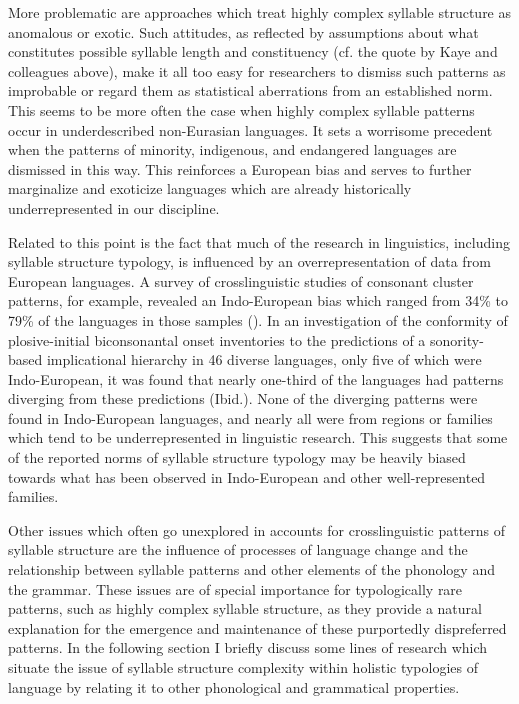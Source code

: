   More problematic are approaches which treat highly complex syllable structure as anomalous or exotic. Such attitudes, as reflected by assumptions about what constitutes possible syllable length and constituency (cf. the quote by Kaye and colleagues above), make it all too easy for researchers to dismiss such patterns as improbable or regard them as statistical aberrations from an established norm. This seems to be more often the case when highly complex syllable patterns occur in underdescribed non-Eurasian languages. It sets a worrisome precedent when the patterns of minority, indigenous, and endangered languages are dismissed in this way. This reinforces a European bias and serves to further marginalize and exoticize languages which are already historically underrepresented in our discipline.

  Related to this point is the fact that much of the research in linguistics, including syllable structure typology, is influenced by an overrepresentation of data from European languages. A survey of crosslinguistic studies of consonant cluster patterns, for example, revealed an Indo-European bias which ranged from 34\% \citep{Morelli1999} to 79\% \citep{Vennemann2012} of the languages in those samples (\citealt{EasterdayNapoleãodeSouza2015}). In an investigation of the conformity of plosive-initial biconsonantal onset inventories to the predictions of a sonority-based implicational hierarchy in 46 diverse languages, only five of which were Indo-European, it was found that nearly one-third of the languages had patterns diverging from these predictions (Ibid.). None of the diverging patterns were found in Indo-European languages, and nearly all were from regions or families which tend to be underrepresented in linguistic research. This suggests that some of the reported norms of syllable structure typology may be heavily biased towards what has been observed in Indo-European and other well-represented families.

  Other issues which often go unexplored in accounts for crosslinguistic patterns of syllable structure are the influence of processes of language change and the relationship between syllable patterns and other elements of the phonology and the grammar. These issues are of special importance for typologically rare patterns, such as highly complex syllable structure, as they provide a natural explanation for the emergence and maintenance of these purportedly dispreferred patterns. In the following section I briefly discuss some lines of research which situate the issue of syllable structure complexity within holistic typologies of language by relating it to other phonological and grammatical properties.

